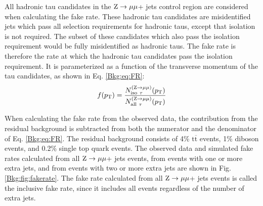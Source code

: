 \documentclass[12pt]{thesis}  %
\renewcommand{\ttbar}{\ensuremath{\mathrm{t}\overline{\mathrm{t}}}\xspace}
\newcommand{\ra}{\ensuremath{\rightarrow}}%
\newcommand{\Zmm}{\ensuremath{\Z \ra \mu\mu}\xspace}%
\begin{document}
All hadronic tau candidates in the \Zmm + jets control region are considered when calculating the fake rate. These hadronic tau candidates are misidentified jets which pass all selection requirements for hadronic taus, except that isolation is not required. The subset of these candidates which also pass the isolation requirement would be fully misidentified as hadronic taus. The fake rate is therefore the rate at which the hadronic tau candidates pass the isolation requirement. It is parameterized as a function of the transverse momentum of the tau candidates, as shown in Eq. \eqref{Bkg:eq:FR}:
\begin{equation} f(\pt) = \frac{N_{\text{iso}~\tau}^{(\Zmm)}(\pt)}{N_{\text{all}~\tau}^{(\Zmm)}(\pt)} \label{Bkg:eq:FR} \end{equation}


When calculating the fake rate from the observed data, the contribution from the residual background is subtracted from both the numerator and the denominator of Eq. \eqref{Bkg:eq:FR}. The residual background consists of 4\% \ttbar events, 1\% diboson events, and 0.2\% single top quark events. The observed data and simulated fake rates calculated from all \Zmm + jets events, from events with one or more extra jets, and from events with two or more extra jets are shown in Fig. \ref{Bkg:fig:fakerate}. The fake rate calculated from all \Zmm + jets events is called the inclusive fake rate, since it includes all events regardless of the number of extra jets.
\end{document}
